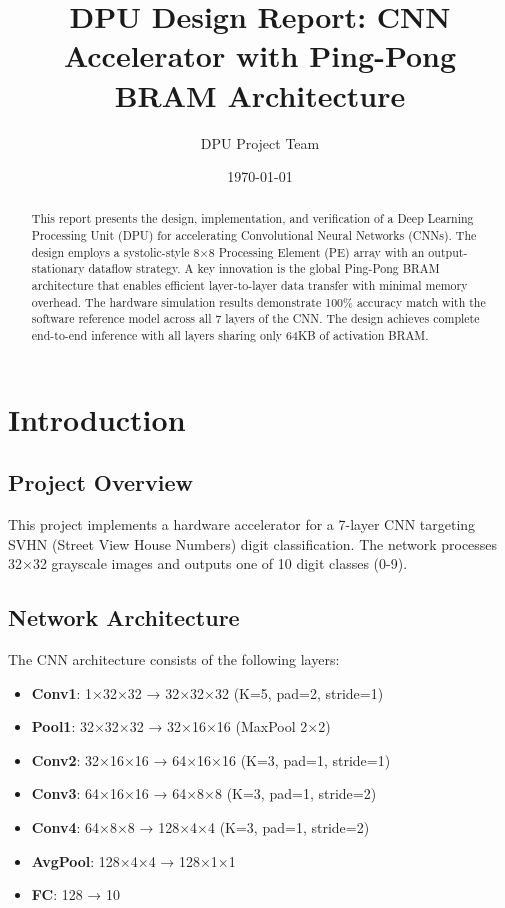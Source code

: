 \documentclass[11pt,a4paper]{article}
\title{\textbf{DPU Design Report: CNN Accelerator with Ping-Pong BRAM Architecture}}
\author{DPU Project Team}
\date{\today}
\begin{document}
\maketitle

\begin{abstract}
This report presents the design, implementation, and verification of a Deep Learning Processing Unit (DPU) for accelerating Convolutional Neural Networks (CNNs). The design employs a systolic-style 8×8 Processing Element (PE) array with an output-stationary dataflow strategy. A key innovation is the global Ping-Pong BRAM architecture that enables efficient layer-to-layer data transfer with minimal memory overhead. The hardware simulation results demonstrate 100\% accuracy match with the software reference model across all 7 layers of the CNN. The design achieves complete end-to-end inference with all layers sharing only 64KB of activation BRAM.
\end{abstract}

\tableofcontents
\newpage

\section{Introduction}

\subsection{Project Overview}
This project implements a hardware accelerator for a 7-layer CNN targeting SVHN (Street View House Numbers) digit classification. The network processes 32×32 grayscale images and outputs one of 10 digit classes (0-9).

\subsection{Network Architecture}
The CNN architecture consists of the following layers:
\begin{itemize}
    \item \textbf{Conv1}: 1×32×32 → 32×32×32 (K=5, pad=2, stride=1)
    \item \textbf{Pool1}: 32×32×32 → 32×16×16 (MaxPool 2×2)
    \item \textbf{Conv2}: 32×16×16 → 64×16×16 (K=3, pad=1, stride=1)
    \item \textbf{Conv3}: 64×16×16 → 64×8×8 (K=3, pad=1, stride=2)
    \item \textbf{Conv4}: 64×8×8 → 128×4×4 (K=3, pad=1, stride=2)
    \item \textbf{AvgPool}: 128×4×4 → 128×1×1
    \item \textbf{FC}: 128 → 10
\end{itemize}
\end{document}
